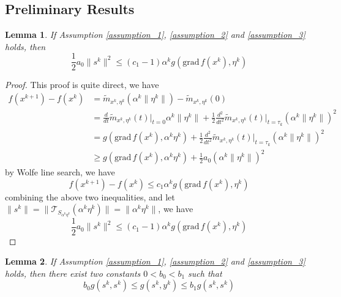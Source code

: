 \documentclass[12pt,a4paper,draft]{article}  %
\newtheorem{lemma}{Lemma}[section]
\theoremstyle{definition}
\numberwithin{equation}{section}
\newcommand{\grad}{\mathrm{grad}\,}
\newcommand{\VT}{\mathcal{T}}
\begin{document}
\subsection{Preliminary Results}
\begin{lemma}\label{lemma_1}
        If Assumption \ref{assumption_1}, \ref{assumption_2} and \ref{assumption_3} holds, then 
        \begin{equation}
                \frac{1}{2}a_0\|s^k\|^2 \leq (c_1-1)\alpha^k g(\grad f(x^k), \eta^k)
        \end{equation}
\end{lemma}
\begin{proof}
        This proof is quite direct, we have
        \begin{equation*}
                \begin{aligned}
                        f(x^{k+1}) - f(x^k) &= \widetilde{m}_{x^k,\eta^k}(\alpha^k\|\eta^k\|) - \widetilde{m}_{x^k,\eta^k}(0)\\
                        &= \frac{d}{dt}\widetilde{m}_{x^k,\eta^k}(t)\Big|_{t=0}\alpha^k\|\eta^k\| + \frac{1}{2}\frac{d^2}{dt^2}\widetilde{m}_{x^k,\eta^k}(t)\Big|_{t=\tau_k}(\alpha^k\|\eta^k\|)^2\\
                        &= g(\grad f(x^k), \alpha^k\eta^k) + \frac{1}{2}\frac{d^2}{dt^2}\widetilde{m}_{x^k,\eta^k}(t)\Big|_{t=\tau_k}(\alpha^k\|\eta^k\|)^2\\
                        &\geq g(\grad f(x^k), \alpha^k\eta^k) + \frac{1}{2}a_0(\alpha^k\|\eta^k\|)^2
                \end{aligned}
        \end{equation*}
        by Wolfe line search, we have
        \begin{equation*}
                f(x^{k+1}) - f(x^k) \leq c_1\alpha^k g(\grad f(x^k), \eta^k)
        \end{equation*}
        combining the above two inequalities, and let $\|s^k\| = \|\VT_{S_{\alpha^k\eta^k}}(\alpha^k\eta^k)\| = \|\alpha^k\eta^k\|$, we have
        \begin{equation*}
                \frac{1}{2}a_0\|s^k\|^2 \leq (c_1-1)\alpha^k g(\grad f(x^k), \eta^k)
        \end{equation*}
\end{proof}
\begin{lemma}\label{lemma_2}
        If Assumption \ref{assumption_1}, \ref{assumption_2} and \ref{assumption_3} holds, then there exist two constants $0<b_0<b_1$ such that
        \begin{equation}\label{lemma_2_eq}
                b_0g(s^k,s^k)\leq g(s^k,y^k) \leq b_1 g(s^k,s^k)
        \end{equation}
\end{lemma}
\end{document}
